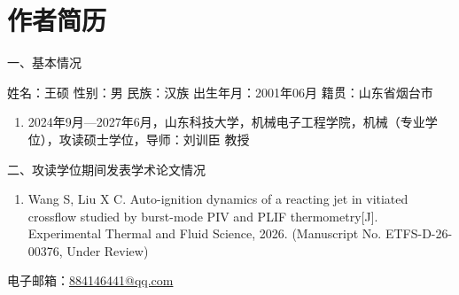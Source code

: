 \chapter*{作者简历}

一、基本情况

姓名：王硕 \qquad 性别：男 \qquad 民族：汉族 \qquad 出生年月：2001年06月 \qquad 籍贯：山东省烟台市

\begin{enumerate}
	\item 2024年9月—2027年6月，山东科技大学，机械电子工程学院，机械（专业学位），攻读硕士学位，导师：刘训臣 教授
\end{enumerate}

二、攻读学位期间发表学术论文情况

\begin{enumerate}
	\item Wang S, Liu X C. Auto-ignition dynamics of a reacting jet in vitiated crossflow studied by burst-mode PIV and PLIF thermometry[J]. Experimental Thermal and Fluid Science, 2026. (Manuscript No. ETFS-D-26-00376, Under Review)
\end{enumerate}

\noindent 电子邮箱：\href{mailto:884146441@qq.com}{884146441@qq.com}